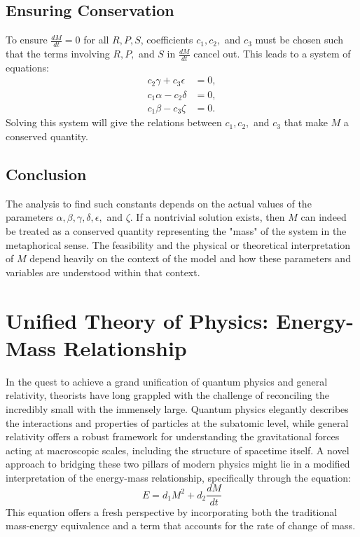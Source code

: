 \documentclass{article}
\begin{document}
\subsection*{Ensuring Conservation}
To ensure \( \frac{dM}{dt} = 0 \) for all \( R, P, S \), coefficients \( c_1, c_2, \) and \( c_3 \) must be chosen such that the terms involving \( R, P, \) and \( S \) in \( \frac{dM}{dt} \) cancel out. This leads to a system of equations:
\[
\begin{align*}
c_2 \gamma + c_3 \epsilon &= 0, \\
c_1 \alpha - c_2 \delta &= 0, \\
c_1 \beta - c_3 \zeta &= 0.
\end{align*}
\]
Solving this system will give the relations between \( c_1, c_2, \) and \( c_3 \) that make \( M \) a conserved quantity.

\subsection*{Conclusion}

The analysis to find such constants depends on the actual values of the parameters \( \alpha, \beta, \gamma, \delta, \epsilon, \) and \( \zeta \). If a nontrivial solution exists, then \( M \) can indeed be treated as a conserved quantity representing the "mass" of the system in the metaphorical sense. The feasibility and the physical or theoretical interpretation of \( M \) depend heavily on the context of the model and how these parameters and variables are understood within that context.
\section*{Unified Theory of Physics: Energy-Mass Relationship}
In the quest to achieve a grand unification of quantum physics and general relativity, theorists have long grappled with the challenge of reconciling the incredibly small with the immensely large. Quantum physics elegantly describes the interactions and properties of particles at the subatomic level, while general relativity offers a robust framework for understanding the gravitational forces acting at macroscopic scales, including the structure of spacetime itself. A novel approach to bridging these two pillars of modern physics might lie in a modified interpretation of the energy-mass relationship, specifically through the equation:
\[
E = d_1 M^2 + d_2 \frac{dM}{dt}
\]
This equation offers a fresh perspective by incorporating both the traditional mass-energy equivalence and a term that accounts for the rate of change of mass.
\end{document}
